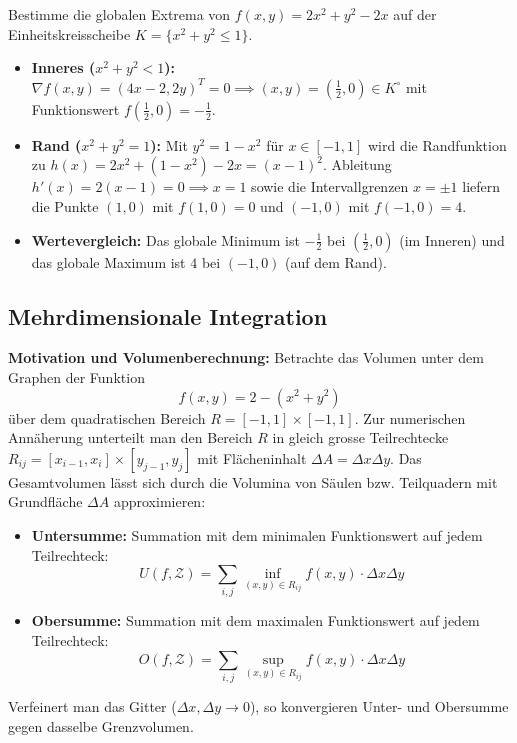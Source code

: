 \begin{example}
    Bestimme die globalen Extrema von $f(x, y) = 2x^2 + y^2 - 2x$ auf der Einheitskreisscheibe $K = \{x^2 + y^2 \le 1\}$.
    \begin{itemize}
        \item \textbf{Inneres ($x^2 + y^2 < 1$):} $\nabla f(x, y) = (4x - 2, 2y)^T = 0 \implies (x, y) = \left(\frac{1}{2}, 0\right) \in K^\circ$ mit Funktionswert $f\left(\frac{1}{2}, 0\right) = -\frac{1}{2}$.
        \item \textbf{Rand ($x^2 + y^2 = 1$):} Mit $y^2 = 1 - x^2$ für $x \in [-1, 1]$ wird die Randfunktion zu $h(x) = 2x^2 + (1 - x^2) - 2x = (x - 1)^2$. Ableitung $h'(x) = 2(x-1) = 0 \implies x = 1$ sowie die Intervallgrenzen $x = \pm 1$ liefern die Punkte $(1, 0)$ mit $f(1, 0) = 0$ und $(-1, 0)$ mit $f(-1, 0) = 4$.
        \item \textbf{Wertevergleich:} Das globale Minimum ist $-\frac{1}{2}$ bei $\left(\frac{1}{2}, 0\right)$ (im Inneren) und das globale Maximum ist $4$ bei $(-1, 0)$ (auf dem Rand).
    \end{itemize}
\end{example}

\subsection{Mehrdimensionale Integration}

\begin{example}
    \textbf{Motivation und Volumenberechnung:}
    Betrachte das Volumen unter dem Graphen der Funktion
    $$ f(x,y) = 2 - (x^2 + y^2) $$
    über dem quadratischen Bereich $R = [-1,1] \times [-1,1]$.
    Zur numerischen Annäherung unterteilt man den Bereich $R$ in gleich grosse Teilrechtecke $R_{ij} = [x_{i-1}, x_i] \times [y_{j-1}, y_j]$ mit Flächeninhalt $\Delta A = \Delta x \Delta y$.
    Das Gesamtvolumen lässt sich durch die Volumina von Säulen bzw. Teilquadern mit Grundfläche $\Delta A$ approximieren:
    \begin{itemize}
        \item \textbf{Untersumme:} Summation mit dem minimalen Funktionswert auf jedem Teilrechteck:
        $$ U(f, \mathcal{Z}) = \sum_{i,j} \inf_{(x,y) \in R_{ij}} f(x,y) \cdot \Delta x \Delta y $$
        \item \textbf{Obersumme:} Summation mit dem maximalen Funktionswert auf jedem Teilrechteck:
        $$ O(f, \mathcal{Z}) = \sum_{i,j} \sup_{(x,y) \in R_{ij}} f(x,y) \cdot \Delta x \Delta y $$
    \end{itemize}
    Verfeinert man das Gitter ($\Delta x, \Delta y \to 0$), so konvergieren Unter- und Obersumme gegen dasselbe Grenzvolumen.
\end{example}

